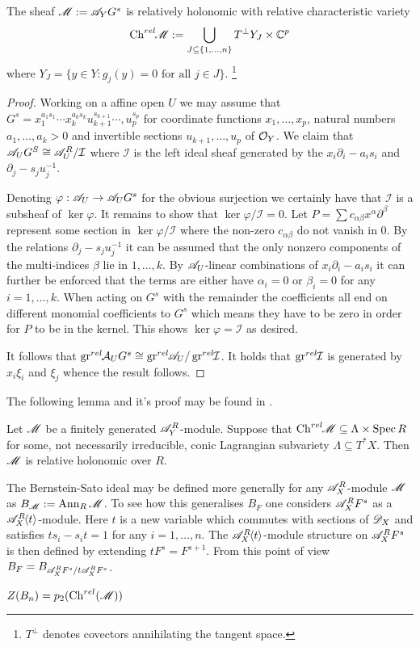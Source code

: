 \begin{lemma}
  The sheaf $\mathscr{M} := \mathscr{A}_Y G^s$ is relatively holonomic with relative characteristic variety
  $$\operatorname{Ch}^{rel}\mkern-5mu \mathscr{M} := \bigcup_{J\subseteq \{1,\ldots, n\}} T^\perp Y_J \times \mathbb{C}^p $$
  where $Y_J = \{y\in Y: g_j(y) = 0  \text{ for all }j\in J \}$. \footnote{$T^\perp$ denotes covectors annihilating the tangent space. }
\end{lemma}
\begin{proof}
  Working on a affine open $U$ we may assume that $G^s=x_1^{a_1s_1}\cdots x_k^{a_k s_k} u_{k+1}^{s_{k+1}} \cdots, u_{p}^{s_p}$ for coordinate functions $x_1,\ldots, x_p$, natural numbers $a_1,\ldots, a_k>0$ and invertible sections $u_{k+1},\ldots,u_{p}$ of $\mathcal{O}_Y$.
  We claim that $\mathscr{A}_U G^S \cong \mathscr{A}_U^R/\mathcal{I}$ where $\mathcal{I}$ is the left ideal sheaf generated by the $x_i\partial_i - a_is_i$ and $\partial_{j} - s_{j}u_j^{-1}$.

  Denoting $\varphi:\mathscr{A}_U \to \mathscr{A}_U G^s$ for the obvious surjection we certainly have that $\mathcal{I}$ is a subsheaf of $\ker \varphi$.
  It remains to show that $\ker\varphi / \mathcal{I} = 0$.
  Let $P=\sum c_{\alpha \beta} x^\alpha \partial^\beta$ represent some section in $\ker \varphi/\mathcal{I}$ where the non-zero $c_{\alpha \beta}$ do not vanish in $0$.
  By the relations $\partial_{j} - s_{j}u_j^{-1}$ it can be assumed that the only nonzero components of the multi-indices $\beta$ lie in $1,\ldots, k$.
  By $\mathscr{A}_U$-linear combinations of $x_i \partial_i - a_is_i$ it can further be enforced that the terms are either have $\alpha_i = 0$ or $\beta_i = 0$ for any $i=1,\ldots, k$. When acting on $G^s$ with the remainder the coefficients all end on different monomial coefficients to $G^s$ which means they have to be zero in order for $P$ to be in the kernel. This shows $\ker\varphi = \mathcal{I}$ as desired.

  It follows that $\operatorname{gr}^{rel}\mkern-5mu \mathcal{A}_UG^s \cong \operatorname{gr}^{rel}\mkern-5mu\mathscr{A}_U /\operatorname{gr}^{rel}\mkern-5mu \mathcal{I}$. It holds that $\operatorname{gr}^{rel}\mkern-5mu \mathcal{I}$ is generated by $x_i \xi_i$ and $\xi_j$ whence the result follows.
\end{proof}
The following lemma and it's proof may be found in \cite{maisonobe2016filtration}.
\begin{lemma}
  Let $\mathscr{M}$ be a finitely generated $\mathscr{A}_Y^R$-module. Suppose that $\operatorname{Ch}^{rel}\mkern-5mu \mathscr{M} \subseteq \Lambda \times \operatorname{Spec} R$ for some, not necessarily irreducible, conic Lagrangian subvariety $\Lambda\subseteq T^*X$. Then $\mathscr{M}$ is relative holonomic over $R$.
\end{lemma}
The Bernstein-Sato ideal may be defined more generally for any $\mathscr{A}_X^R$-module $\mathscr{M}$ as $B_{\mathscr{M}} := \operatorname{Ann}_{R}\mathscr{M}$. To see how this generalises $B_F$ one considers $\mathscr{A}_X^R F^s$ as a $\mathscr{A}_X^R\mkern-5mu\left\langle t \right\rangle$-module.
Here $t$ is a new variable which commutes with sections of $\mathscr{D}_X$ and satisfies $ts_i - s_it = 1$ for any $i=1,\ldots, n$.  The $\mathscr{A}_X^R\mkern-5mu\left\langle t \right\rangle$-module structure on $\mathscr{A}_X^R F^s$ is then defined by extending $tF^s = F^{s + 1}$. From this point of view $B_F = B_{\mathscr{A}_X^R F^s / t\mathscr{A}_X^R F^s}$.
\begin{proposition}\label{prop: ProjectionBernsteinSatoRelativeChar}
  $Z(B_n) = p_2(\operatorname{Ch}^{rel}(\mathscr{M}))$
\end{proposition}

